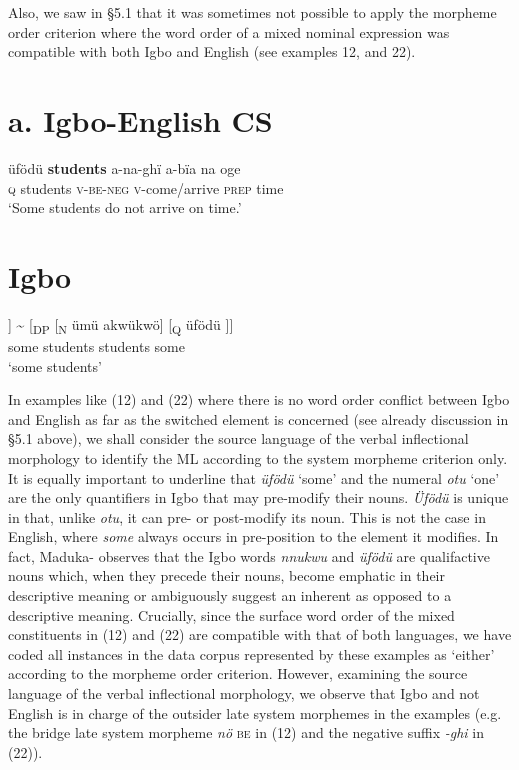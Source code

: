 \documentclass[output=paper]{langsci/langscibook}
\begin{document}
Also, we saw in §5.1 that it was sometimes not possible to apply the morpheme order criterion where the word order of a mixed nominal expression was compatible with both Igbo and English (see examples 12, and 22).

\chapter{a. Igbo-English CS}
\gll üfödü  \textbf{students}\textbf{  }a-na-ghï   a-bïa    na   oge\\
     \textsc{q}     students  \textsc{v-be-neg}  \textsc{v}{}-come/arrive  \textsc{prep}  time   \\
\glt ‘Some students do not arrive on time.’
\z

\chapter{Igbo }
\gll [\textsubscript{DP}\textsuperscript{ }[\textsubscript{Q }üfödü]  [\textsubscript{N }ümü akwükwö]] {\textasciitilde} [\textsubscript{DP }[\textsubscript{N  }ümü akwükwö]  [\textsubscript{Q }üfödü\textsubscript{ }]]\\
           some      students              students        some\\
\glt ‘some students’
\z

In examples like (12) and (22) where there is no word order conflict between Igbo and English as far as the switched element is concerned (see already discussion in §5.1 above), we shall consider the source language of the verbal inflectional morphology to identify the ML according to the system morpheme criterion only. It is equally important to underline that \textit{üfödü} ‘some’ and the numeral \textit{otu} ‘one’ are the only quantifiers in Igbo that may pre-modify their nouns. \textit{Üfödü} is unique in that, unlike \textit{otu}, it can pre- or post-modify its noun. This is not the case in English, where \textit{some} always occurs in pre-position to the element it modifies. In fact, Maduka-\citet[239]{Durunze1990} observes that the Igbo words \textit{nnukwu} and \textit{üfödü} are qualifactive nouns which, when they precede their nouns, become emphatic in their descriptive meaning or ambiguously suggest an inherent as opposed to a descriptive meaning. Crucially, since the surface word order of the mixed constituents in (12) and (22) are compatible with that of both languages, we have coded all instances in the data corpus represented by these examples as ‘either’ according to the morpheme order criterion. However, examining the source language of the verbal inflectional morphology, we observe that Igbo and not English is in charge of the outsider late system morphemes in the examples (e.g. the bridge late system morpheme \textit{nö }\textsc{be} in (12) and the negative suffix \textit{{}-ghi }in (22)). 
\end{document}
